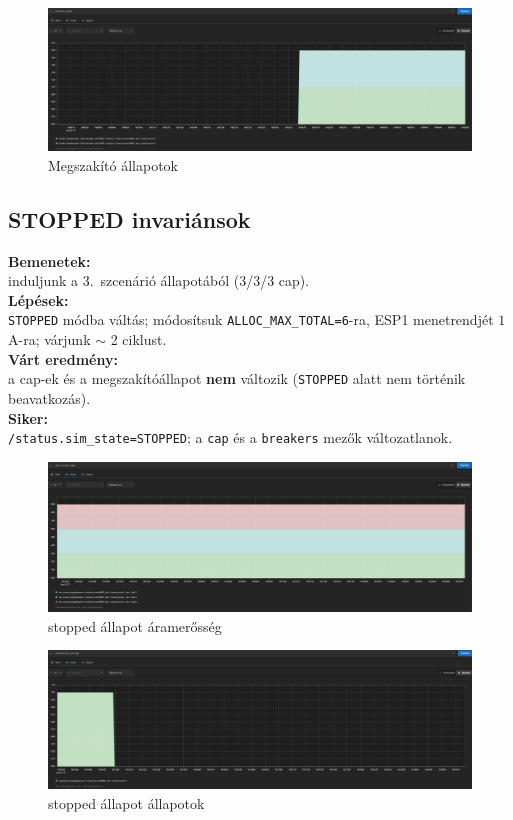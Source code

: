 \begin{figure}[H]
    \centering
    \includegraphics[width=1\textwidth]{figures/megszakító_5_2.png}
    \caption{Megszakító állapotok}
    \label{fig:megszakító_2}
\end{figure}

\subsection{STOPPED invariánsok}
\textbf{Bemenetek:}\\ induljunk a 3.\ szcenárió állapotából (3/3/3 cap).\\
\textbf{Lépések:}\\ \texttt{STOPPED} módba váltás; módosítsuk \texttt{ALLOC\_MAX\_TOTAL=6}-ra, 
ESP1 menetrendjét \(1\) A-ra; várjunk \(\sim\) 2 ciklust.\\
\textbf{Várt eredmény:}\\ a cap-ek és a megszakítóállapot \textbf{nem} változik (\texttt{STOPPED} 
alatt nem történik beavatkozás).\\
\textbf{Siker:}\\ \texttt{/status.sim\_state=STOPPED}; a \texttt{cap} és a \texttt{breakers} mezők változatlanok.

\begin{figure}[H]
    \centering
    \includegraphics[width=1\textwidth]{figures/stop_6_1.png}
    \caption{stopped állapot áramerősség}
    \label{fig:stop_1}
\end{figure}

\begin{figure}[H]
    \centering
    \includegraphics[width=1\textwidth]{figures/stop_6_2.png}
    \caption{stopped állapot állapotok}
    \label{fig:stop_2}
\end{figure}

